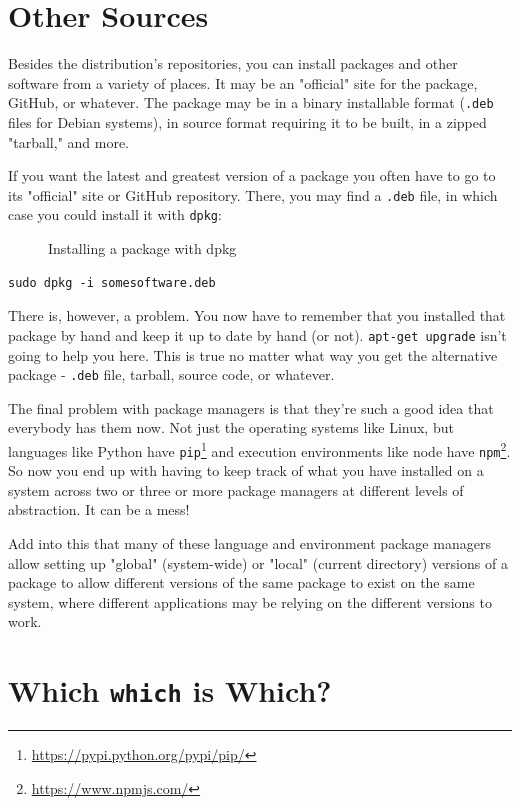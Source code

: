 \documentclass[10pt,]{book}
\renewcommand{\href}[2]{#2\footnote{\url{#1}}}
\numberwithin{figure}{chapter}
\DeclareRobustCommand{\drcap}[1]{\begin{figure}[H]\caption{#1}\end{figure}}
\DeclareRobustCommand{\drcmd}[1]{\index{Commands!#1}}
\begin{document}
\section*{Other Sources}\label{other-sources}

Besides the distribution's repositories, you can install packages and
other software from a variety of places. It may be an "official" site
for the package, GitHub, or whatever. The package may be in a binary
installable format (\texttt{.deb} files for Debian
systems), in source format requiring it to be built, in a zipped
"tarball," and more.

If you want the latest and greatest version of a package you often have
to go to its "official" site or GitHub repository. There, you may find a
\texttt{.deb} file, in which case you could install it with
\texttt{dpkg}\drcmd{dpkg}:

\drcap{Installing a package with dpkg}

\begin{verbatim}
sudo dpkg -i somesoftware.deb
\end{verbatim}

There is, however, a problem. You now have to remember that you
installed that package by hand and keep it up to date by hand (or not).
\texttt{apt-get upgrade} isn't going to help you here. This is true no
matter what way you get the alternative package - \texttt{.deb} file,
tarball, source code, or whatever.

The final problem with package managers is that they're such a good idea
that everybody has them now. Not just the operating systems like Linux,
but languages like Python have
\href{https://pypi.python.org/pypi/pip/}{\texttt{pip}} and execution
environments like node have \href{https://www.npmjs.com/}{\texttt{npm}}.
So now you end up with having to keep track of what you have installed
on a system across two or three or more package managers at different
levels of abstraction. It can be a mess!

Add into this that many of these language and environment package
managers allow setting up "global" (system-wide) or "local" (current
directory) versions of a package to allow different versions of the same
package to exist on the same system, where different applications may be
relying on the different versions to work.

\section*{Which \texttt{which} is Which?}\label{which-which-is-which}
\end{document}
